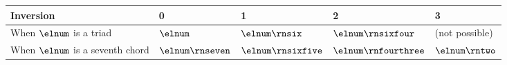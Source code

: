 \begin{tabular}{l|llll}
Inversion & 0 & 1 & 2 & 3 \\ 
\hline
When $\elnum$ is a triad & $\elnum$ & $\elnum\rnsix$ & $\elnum\rnsixfour$ & (not possible) \\
When $\elnum$ is a seventh chord & $\elnum\rnseven$ & $\elnum\rnsixfive$ & $\elnum\rnfourthree$ & $\elnum\rntwo$ \\
\end{tabular}
